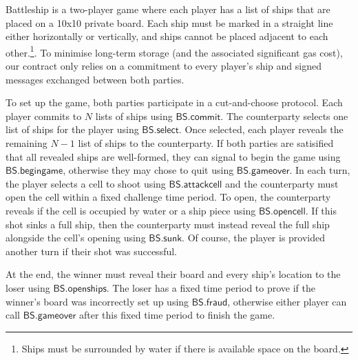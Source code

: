 \documentclass{llncs}
\newcommand{\battleshipfraud}{\mathsf{BS.fraud}}
\newcommand{\battleshipattackcell}{\mathsf{BS.attackcell}}
\newcommand{\battleshipbegin}{\mathsf{BS.begingame}}
\newcommand{\battleshipcommit}{\mathsf{BS.commit}}
\newcommand{\battleshipselectboard}{\mathsf{BS.select}}
\newcommand{\battleshiprevealcell}{\mathsf{BS.opencell}}
\newcommand{\battleshipsinking}{\mathsf{BS.sunk}}
\newcommand{\battleshiprevealboard}{\mathsf{BS.openships}}
\newcommand{\battleshipgameover}{\mathsf{BS.gameover}}
\begin{document}
Battleship is a two-player game where each player has a list of ships that are placed on a 10x10 private board. 
Each ship must be marked in a straight line either horizontally or vertically, and ships cannot be placed adjacent to each other.\footnote{Ships must be surrounded by water if there is available space on the board.}.
To minimise long-term storage (and the associated significant gas cost), our contract only relies on a commitment to every player's ship and signed messages exchanged between both parties. 

To set up the game, both parties participate in a cut-and-choose protocol.
Each player commits to $N$ lists of ships using $\battleshipcommit$. 
The counterparty selects one list of ships for the player using $\battleshipselectboard$.
Once selected, each player reveals the remaining $N-1$ list of ships to the counterparty. 
If both parties are satisified that all revealed ships are well-formed, they can signal to begin the game using $\battleshipbegin$, otherwise they may chose to quit using $\battleshipgameover$. 
In each turn, the player selects a cell to shoot using $\battleshipattackcell$ and the counterparty must open the cell  within a fixed challenge time period. 
To open, the counterparty reveals if the cell is occupied by water or a ship piece using $\battleshiprevealcell$.
If this shot sinks a full ship, then the counterparty must instead reveal the full ship alongside the cell's opening using $\battleshipsinking$. 
Of course, the player is provided another turn if their shot was successful.

At the end, the winner must reveal their board and every ship's location to the loser using $\battleshiprevealboard$.
The loser has a fixed time period to prove if the winner's board was incorrectly set up using $\battleshipfraud$, otherwise either player can call $\battleshipgameover$ after this fixed time period to finish the game. 
\end{document}
